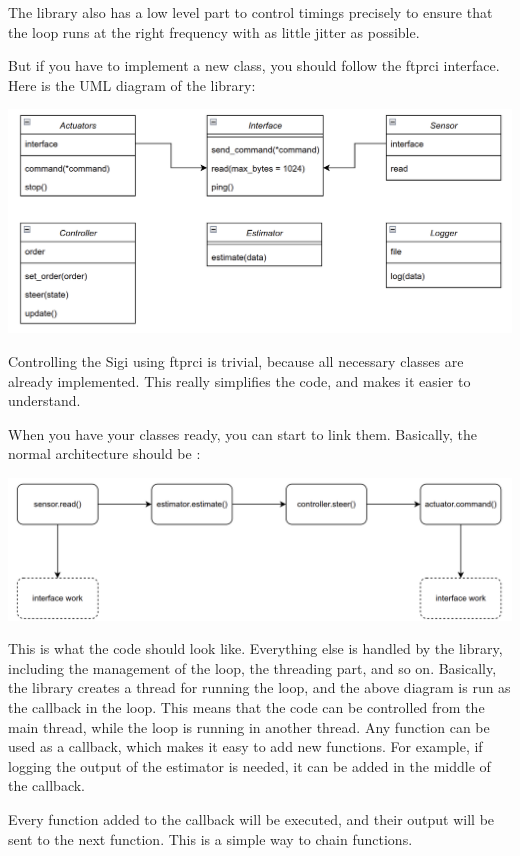 \documentclass{article}
\begin{document}
The library also has a low level part to control timings precisely to ensure that the loop runs at
the right frequency with as little jitter as possible.

But if you have to implement a new class, you should follow the ftprci interface.
Here is the UML diagram of the library:

\includegraphics[scale=0.2]{img/uml_ftprci.png}

Controlling the Sigi using ftprci is trivial, because all necessary classes are already
implemented. This really simplifies the code, and makes it easier to understand.

When you have your classes ready, you can start to link them. Basically, the normal architecture
should be :

\includegraphics[scale=0.2]{img/gen_flowchart_ftprci.png}

This is what the code should look like. Everything else is handled by the library, including
the management of the loop, the threading part, and so on.
Basically, the library creates a thread for running the loop, and the above diagram is run as
the callback in the loop.
This means that the code can be controlled from the main thread, while
the loop is running in another thread.
Any function can be used as a callback, which makes it easy to add new functions. For example, if
logging the output of the estimator is needed, it can be added in the middle of the callback.

Every function added to the callback will be executed, and their output will be sent to the next
function. This is a simple way to chain functions.
\end{document}
